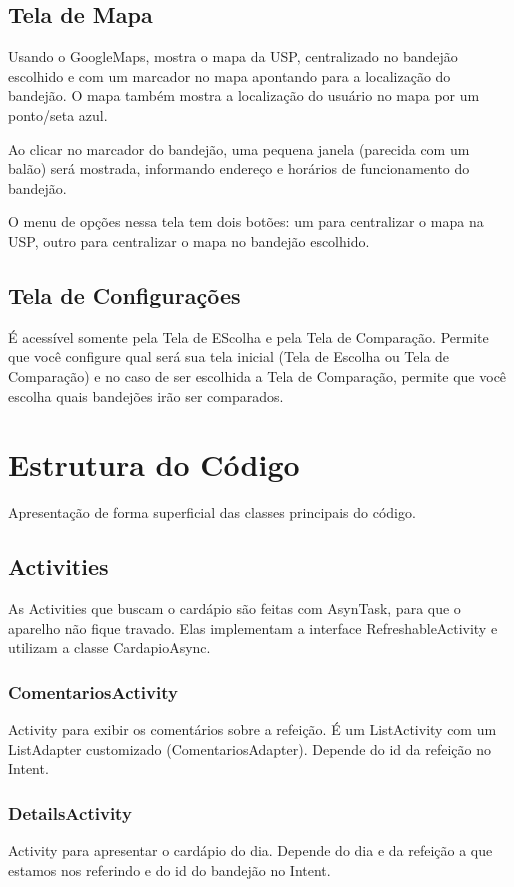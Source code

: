 \subsection{Tela de Mapa}
Usando o GoogleMaps, mostra o mapa da USP, centralizado no bandejão escolhido e com um marcador no mapa apontando para a localização do bandejão.
O mapa também mostra a localização do usuário no mapa por um ponto/seta azul.

Ao clicar no marcador do bandejão, uma pequena janela (parecida com um balão) será mostrada, informando endereço e horários de funcionamento do bandejão.

O menu de opções nessa tela tem dois botões: um para centralizar o mapa na USP, outro para centralizar o mapa no bandejão escolhido.

\subsection{Tela de Configurações}
É acessível somente pela Tela de EScolha e pela Tela de Comparação. Permite que você configure qual será sua tela inicial (Tela de Escolha ou Tela de Comparação) e no caso de ser escolhida a Tela de Comparação, permite que você escolha quais bandejões irão ser comparados.

\section{Estrutura do Código}
Apresentação de forma superficial das classes principais do código.
\subsection{Activities}

As Activities que buscam o cardápio são feitas com AsynTask, para que o aparelho não fique travado. Elas implementam a interface RefreshableActivity e utilizam a classe CardapioAsync.

\subsubsection{ComentariosActivity}
Activity para exibir os comentários sobre a refeição. É um ListActivity com um ListAdapter customizado (ComentariosAdapter). Depende do id da refeição no Intent.

\subsubsection{DetailsActivity}
Activity para apresentar o cardápio do dia. Depende do dia e da refeição a que estamos nos referindo e do id do bandejão no Intent.

